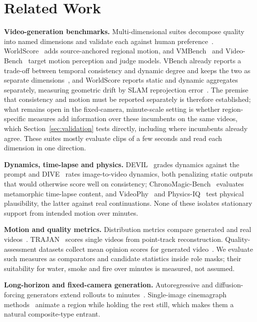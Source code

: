 \section{Related Work}
\label{sec:related}
\textbf{Video-generation benchmarks.} Multi-dimensional suites decompose quality into named dimensions and validate each against human preference~\cite{huang2023vbench,huang2024vbench++,Zheng2025VBench20AV,liu2024evalcrafter,liu2023fetv,sun2024t2v_compbench}. WorldScore~\cite{duan2025worldscore} adds source-anchored regional motion, and VMBench~\cite{ling2025vmbench} and Video-Bench~\cite{han2025videobench} target motion perception and judge models. VBench already reports a trade-off between temporal consistency and dynamic degree and keeps the two as separate dimensions~\cite{huang2023vbench}, and WorldScore reports static and dynamic aggregates separately, measuring geometric drift by SLAM reprojection error~\cite{duan2025worldscore}. The premise that consistency and motion must be reported separately is therefore established; what remains open in the fixed-camera, minute-scale setting is whether region-specific measures add information over these incumbents on the same videos, which Section~\ref{sec:validation} tests directly, including where incumbents already agree. These suites mostly evaluate clips of a few seconds and read each dimension in one direction.

\textbf{Dynamics, time-lapse and physics.} DEVIL~\cite{liao2024devil} grades dynamics against the prompt and DIVE~\cite{liu2025dynamici2v} rates image-to-video dynamics, both penalizing static outputs that would otherwise score well on consistency; ChronoMagic-Bench~\cite{yuan2024chronomagic} evaluates metamorphic time-lapse content, and VideoPhy~\cite{bansal2025videophy} and Physics-IQ~\cite{motamed2025physicsiq} test physical plausibility, the latter against real continuations. None of these isolates stationary support from intended motion over minutes.

\textbf{Motion and quality metrics.} Distribution metrics compare generated and real videos~\cite{Unterthiner2018TowardsAG_FVD,liu2024fvmd}. TRAJAN~\cite{allen2025trajan} scores single videos from point-track reconstruction. Quality-assessment datasets collect mean opinion scores for generated video~\cite{kou2024t2vqa,hveval2026}. We evaluate such measures as comparators and candidate statistics inside role masks; their suitability for water, smoke and fire over minutes is measured, not assumed.

\textbf{Long-horizon and fixed-camera generation.} Autoregressive and diffusion-forcing generators extend rollouts to minutes~\cite{yin2025causvid,huang2025selfforcing,liu2025rolling,yang2025longlive,helios,li2025stable}. Single-image cinemagraph methods~\cite{holynski2021animating,mahapatra2022controllable} animate a region while holding the rest still, which makes them a natural composite-type entrant.

